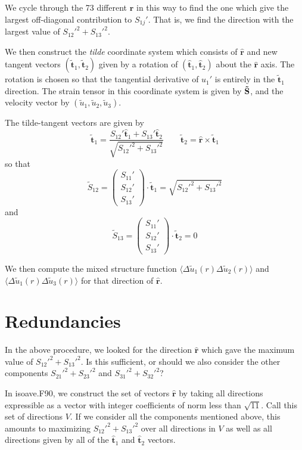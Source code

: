 \documentclass[12pt]{article}
\begin{document}
We cycle through the 73 different $\bm{{\hat r}}$ in this way to find the one 
which give the largest off-diagonal
contribution to $S_{1j}'$.  That is, we find the 
direction with the largest value of $S_{12}'^2 + S_{13}'^2$.  

We then construct the {\em tilde} coordinate system which consists
of $\bm{{\hat r}}$ and new tangent vectors $( \bm{{\tilde t}}_1, 
\bm{{\tilde t}}_2 )$ given by a rotation of $( \bm{{\hat t}}_1, \bm{{\hat t}}_2 )$
about the $\bm{{\hat r}}$ axis.  The rotation is chosen so that the 
tangential derivative of $u_1'$ is entirely in the $\bm{{\tilde t}}_1$
direction.  The strain tensor in this coordinate system
is given by ${\bf \tilde S}$, and the velocity vector by 
$( \tilde u_1, \tilde u_2, \tilde u_3)$. 

The tilde-tangent vectors are given by 
\[
\bm{{\tilde t}}_1 = \frac{S_{12}'  \bm{{\hat t}}_1 +  S_{13}'  \bm{{\hat t}}_2 }
                         {\sqrt{ S_{12}'^2 +  S_{13}'^2 } } 
\qquad
\bm{{\tilde t}}_2 = \bm{{\hat r}} \times \bm{{\tilde t}}_1
\]
so that
\[
\tilde S_{12} = 
\begin{pmatrix}  S_{11}' \\
                 S_{12}' \\
                 S_{13}' 
\end{pmatrix}
\cdot \bm{{\tilde t}}_1 = 
 \sqrt{ S_{12}'^2 + S_{13}'^2 }
\]
and 
\[
\tilde S_{13} = 
\begin{pmatrix}  S_{11}' \\
                 S_{12}' \\
                 S_{13}' 
\end{pmatrix}
\cdot \bm{{\tilde t}}_2 =  0
\]


We then compute the mixed structure function $\langle \Delta \tilde u_1 (r) 
\Delta \tilde u_2 (r)\rangle$ and 
$\langle \Delta \tilde u_1 (r) \Delta \tilde u_3 (r)\rangle$ for that direction of $\bm{{\hat r}}$.

\section*{Redundancies}

In the above procedure, we looked for the direction $ \bm{{\hat r}}$
which gave the maximum value of $S_{12}'^2 + S_{13}'^2$.  
Is this sufficient, or should we also consider the other
components $S_{21}'^2 + S_{23}'^2$ and 
$S_{31}'^2 + S_{32}'^2$?  

In isoave.F90, we construct the set of vectors $\bm{{\hat r}}$ 
by taking all directions expressible as a vector with integer
coefficients of norm less than $\sqrt{11}$. Call this set
of directions $V$.   If we consider all the components mentioned
above, this amounts to maximizing $S_{12}'^2 + S_{13}'^2$ over
all directions in $V$ as well as all directions given by
all of the $\bm{{\hat t}}_1$ and $\bm{{\hat t}}_2$ vectors.
\end{document}
